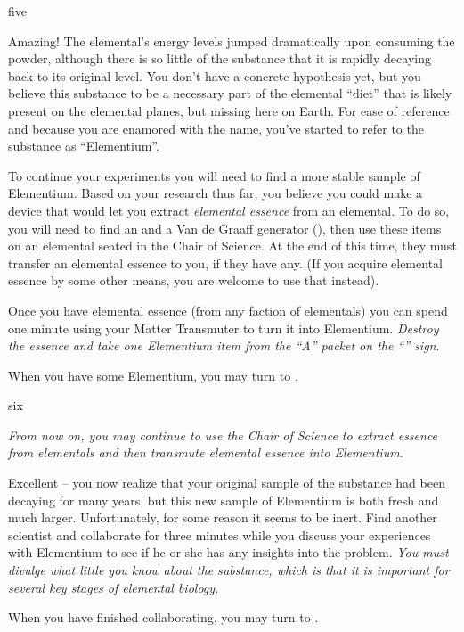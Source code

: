 \documentclass[notebook]{elementals}
\begin{document}
\begin{page}{five}

Amazing! The elemental's energy levels jumped dramatically upon consuming the powder, although there is so little of the substance that it is rapidly decaying back to its original level. You don't have a concrete hypothesis yet, but you believe this substance to be a necessary part of the elemental ``diet'' that is likely present on the elemental planes, but missing here on Earth. For ease of reference and because you are enamored with the name, you've started to refer to the substance as ``Elementium''.

To continue your experiments you will need to find a more stable sample of Elementium. Based on your research thus far, you believe you could make a device that would let you extract \emph{elemental essence} from an elemental. To do so, you will need to find an \iAluminum{} and a Van de Graaff generator (\iVanDeGraaff{\MYnumber}), then use these items on an elemental seated in the Chair of Science. At the end of this time, they must transfer an elemental essence to you, if they have any. (If you acquire elemental essence by some other means, you are welcome to use that instead).

Once you have elemental essence (from any faction of elementals) you can spend one minute using your Matter Transmuter to turn it into Elementium. \emph{Destroy the essence and take one Elementium item from the ``A'' packet on the ``\sTransmogrifier{}'' sign}.

When you have some Elementium, you may turn to .

\end{page}

\begin{page}{six}

\emph{From now on, you may continue to use the Chair of Science to extract essence from elementals and then transmute elemental essence into Elementium.}

Excellent -- you now realize that your original sample of the substance had been decaying for many years, but this new sample of Elementium is both fresh and much larger. Unfortunately, for some reason it seems to be inert. Find another scientist and collaborate for three minutes while you discuss your experiences with Elementium to see if he or she has any insights into the problem. \emph{You must divulge what little you know about the substance, which is that it is important for several key stages of elemental biology.}

When you have finished collaborating, you may turn to .

\end{page}
\end{document}
